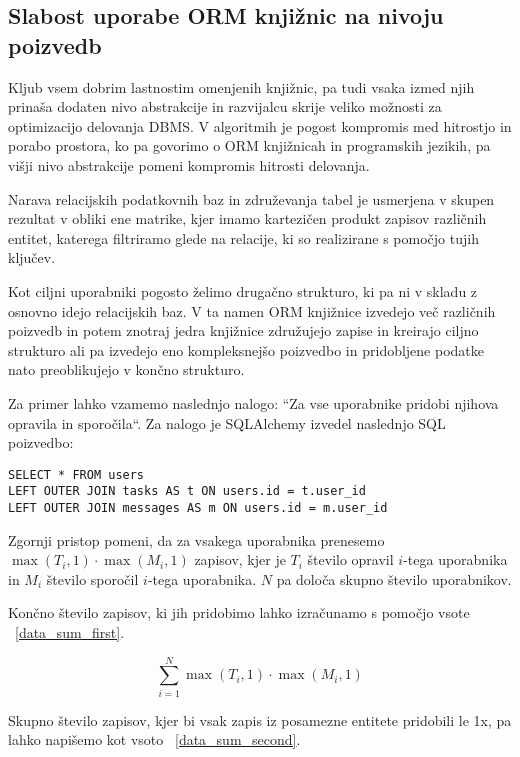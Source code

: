 \documentclass[a4paper,12pt,openright]{book}
\begin{document}
    \subsection{Slabost uporabe ORM knjižnic na nivoju poizvedb}
    Kljub vsem dobrim lastnostim omenjenih knjižnic, pa tudi vsaka izmed njih prinaša dodaten nivo abstrakcije in razvijalcu skrije veliko možnosti za optimizacijo delovanja DBMS. V algoritmih je pogost kompromis med hitrostjo in porabo prostora, ko pa govorimo o ORM knjižnicah in programskih jezikih, pa višji nivo abstrakcije pomeni kompromis hitrosti delovanja.

    Narava relacijskih podatkovnih baz in združevanja tabel je usmerjena v skupen rezultat v obliki ene matrike, kjer imamo kartezičen produkt zapisov različnih entitet, katerega filtriramo glede na relacije, ki so realizirane s pomočjo tujih ključev.
    
    Kot ciljni uporabniki pogosto želimo drugačno strukturo, ki pa ni v skladu z osnovno idejo relacijskih baz. V ta namen ORM knjižnice izvedejo več različnih poizvedb in potem znotraj jedra knjižnice združujejo zapise in kreirajo ciljno strukturo ali pa izvedejo eno kompleksnejšo poizvedbo in pridobljene podatke nato preoblikujejo v končno strukturo.
    
    Za primer lahko vzamemo naslednjo nalogo: ``Za vse uporabnike pridobi njihova opravila in sporočila``. Za nalogo je SQLAlchemy \cite{SQLALCHEMY_GITHUB} izvedel naslednjo SQL poizvedbo:
    \begin{verbatim}
SELECT * FROM users
LEFT OUTER JOIN tasks AS t ON users.id = t.user_id
LEFT OUTER JOIN messages AS m ON users.id = m.user_id
    \end{verbatim}

    \noindent
    Zgornji pristop pomeni, da za vsakega uporabnika prenesemo $\max(T_i, 1) \cdot \max(M_i, 1)$ zapisov, kjer je $T_i$ število opravil $i$-tega uporabnika in $M_i$ število sporočil $i$-tega uporabnika. $N$ pa določa skupno število uporabnikov.

    Končno število zapisov, ki jih pridobimo lahko izračunamo s pomočjo vsote ~\eqref{data_sum_first}.
    
    \begin{equation}
        \sum_{i=1}^{N} \max(T_i, 1) \cdot \max(M_i, 1)
    \label{data_sum_first}
    \end{equation}

    \noindent
    Skupno število zapisov, kjer bi vsak zapis iz posamezne entitete pridobili le 1x, pa lahko napišemo kot vsoto ~\eqref{data_sum_second}.
\end{document}
